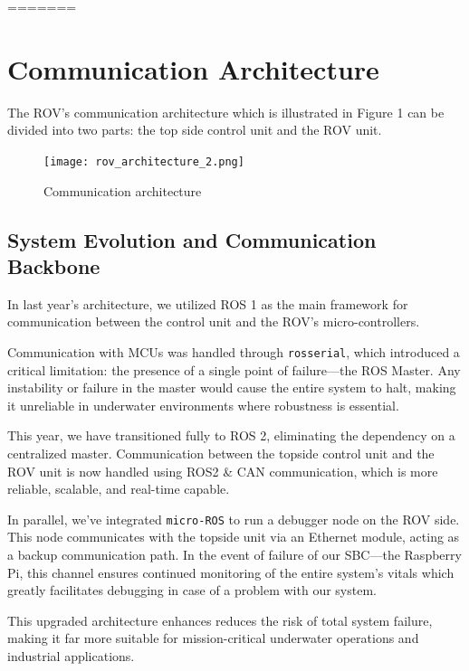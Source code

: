 =======
\section{Communication Architecture}
The ROV's communication architecture which is illustrated in Figure 1 can be divided into two parts: the top side control unit and the ROV unit.

\begin{figure}[ht]
    \centering
    \texttt{[image: rov\_architecture\_2.png]}
    \caption{Communication architecture}
\end{figure}

\subsection{System Evolution and Communication Backbone}

In last year's architecture, we utilized ROS 1 as the main framework for communication between the control unit and the ROV's micro-controllers. 

Communication with MCUs was handled through \texttt{rosserial}, which introduced a critical limitation: the presence of a single point of failure—the ROS Master. Any instability or failure in the master would cause the entire system to halt, making it unreliable in underwater environments where robustness is essential.

\vspace{0.5em}
This year, we have transitioned fully to ROS 2, eliminating the dependency on a centralized master. Communication between the topside control unit and the ROV unit is now handled using ROS2 \& CAN communication, which is more reliable, scalable, and real-time capable.
\vspace{0.5em}


In parallel, we’ve integrated \texttt{micro-ROS} to run a debugger node on the ROV side. This node communicates with the topside unit via an Ethernet module, acting as a backup communication path. In the event of failure of our SBC—the Raspberry Pi, this channel ensures continued monitoring of the entire system's vitals which greatly facilitates debugging in case of a problem with our system.

\vspace{0.5em}
This upgraded architecture enhances reduces the risk of total system failure, making it far more suitable for mission-critical underwater operations and industrial applications.

